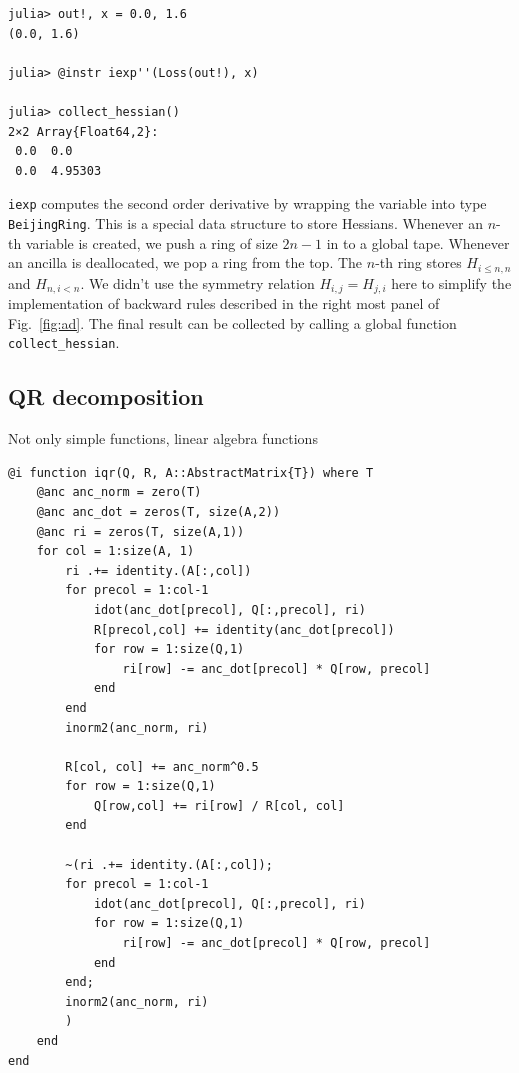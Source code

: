 \documentclass[aps,twocolumn,longbibliography,english,superscriptaddress,prr]{revtex4-1}
\newcommand{\<}{\langle}
\renewcommand{\>}{\rangle}
\newcommand{\Fig}[1]{Fig.~\ref{#1}}
\theoremstyle{definition}\newtheorem{definition}{\textit{Definition}}
\begin{document}
\begin{minipage}{.44\textwidth}
\begin{lstlisting}
julia> out!, x = 0.0, 1.6
(0.0, 1.6)

julia> @instr iexp''(Loss(out!), x)

julia> collect_hessian()
2×2 Array{Float64,2}:
 0.0  0.0
 0.0  4.95303
\end{lstlisting}
\end{minipage}
\texttt{iexp\textquotesingle\textquotesingle} computes the second order derivative by wrapping the variable into type \texttt{BeijingRing}. This is a special data structure to store Hessians. Whenever an $n$-th variable is created, we push a ring of size $2n-1$ in to a global tape. Whenever an ancilla is deallocated, we pop a ring from the top. The $n$-th ring stores $H_{i\leq n,n}$ and $H_{n,i<n}$. We didn't use the symmetry relation $H_{i,j} = H_{j,i}$ here to simplify the implementation of backward rules described in the right most panel of \Fig{fig:ad}.
The final result can be collected by calling a global function \texttt{collect\_hessian}.

\subsection{QR decomposition}

Not only simple functions, linear algebra functions 

\begin{minipage}{.44\textwidth}
\begin{lstlisting}
@i function iqr(Q, R, A::AbstractMatrix{T}) where T
    @anc anc_norm = zero(T)
    @anc anc_dot = zeros(T, size(A,2))
    @anc ri = zeros(T, size(A,1))
    for col = 1:size(A, 1)
        ri .+= identity.(A[:,col])
        for precol = 1:col-1
            idot(anc_dot[precol], Q[:,precol], ri)
            R[precol,col] += identity(anc_dot[precol])
            for row = 1:size(Q,1)
                ri[row] -= anc_dot[precol] * Q[row, precol]
            end
        end
        inorm2(anc_norm, ri)

        R[col, col] += anc_norm^0.5
        for row = 1:size(Q,1)
            Q[row,col] += ri[row] / R[col, col]
        end

        ~(ri .+= identity.(A[:,col]);
        for precol = 1:col-1
            idot(anc_dot[precol], Q[:,precol], ri)
            for row = 1:size(Q,1)
                ri[row] -= anc_dot[precol] * Q[row, precol]
            end
        end;
        inorm2(anc_norm, ri)
        )
    end
end
\end{lstlisting}
\end{minipage}
\end{document}
